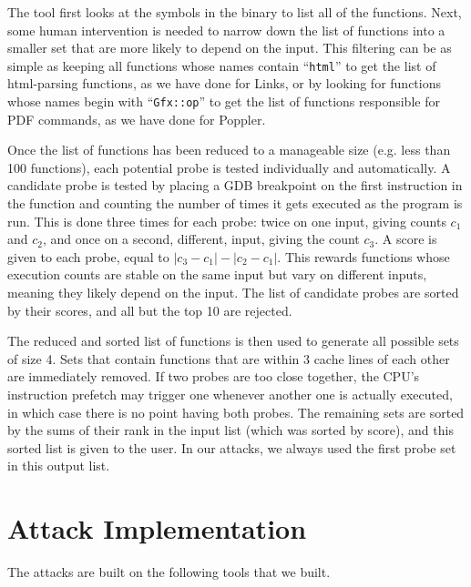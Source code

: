 \documentclass[letterpaper,twocolumn,10pt]{article}
\begin{document}
The tool first looks at the symbols in the binary to list all of the
functions. Next, some human intervention is needed to narrow down the list of
functions into a smaller set that are more likely to depend on the input. This
filtering can be as simple as keeping all functions whose names contain
``\texttt{html}'' to get the list of html-parsing functions, as we have done for
Links, or by looking for functions whose names begin with ``\texttt{Gfx::op}''
to get the list of functions responsible for PDF commands, as we have done for
Poppler.

Once the list of functions has been reduced to a manageable size (e.g. less
than 100 functions), each potential probe is tested individually and
automatically. A candidate probe is tested by placing a GDB breakpoint on the
first instruction in the function and counting the number of times it gets
executed as the program is run. This is done three times for each probe: twice
on one input, giving counts $c_1$ and $c_2$, and once on a second, different,
input, giving the count $c_3$. A score is given to each probe, equal to $|c_3
- c_1| - |c_2 - c_1|$. This rewards functions whose execution counts are stable
on the same input but vary on different inputs, meaning they likely depend on
the input. The list of candidate probes are sorted by their scores, and all but
the top 10 are rejected.


The reduced and sorted list of functions is then used to generate all possible
sets of size 4. Sets that contain functions that are within 3 cache lines of
each other are immediately removed. If two probes are too close together, the
CPU's instruction prefetch may trigger one whenever another
one is actually executed, in which case there is no point having both probes.
The remaining sets are sorted by the sums of their rank in the input list (which
was sorted by score), and this sorted list is given to the user.
In our attacks, we always used the first probe set in this output list.

\section{Attack Implementation}
\label{sec:implementation}

The attacks are built on the following tools that we built.
\end{document}

